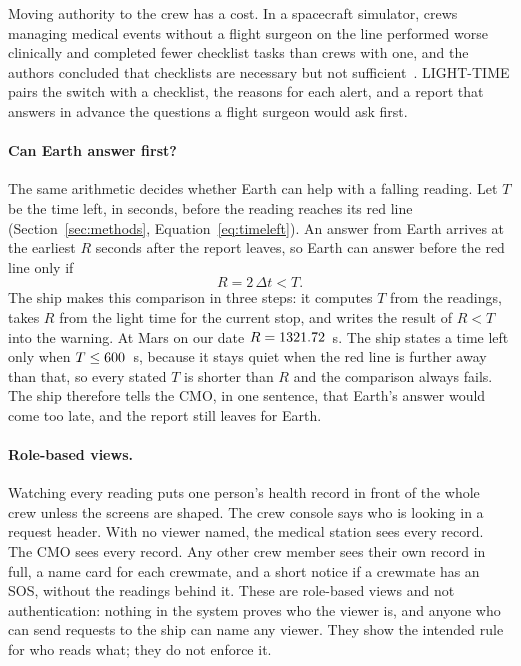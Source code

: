 Moving authority to the crew has a cost. In a spacecraft simulator, crews managing medical events without a flight surgeon on the line performed worse clinically and completed fewer checklist tasks than crews with one, and the authors concluded that checklists are necessary but not sufficient~\cite{yule2023crew}. LIGHT-TIME pairs the switch with a checklist, the reasons for each alert, and a report that answers in advance the questions a flight surgeon would ask first.



\paragraph{Can Earth answer first?}
The same arithmetic decides whether Earth can help with a falling reading. Let $T$ be the time left, in seconds, before the reading reaches its red line (Section~\ref{sec:methods}, Equation~\ref{eq:timeleft}). An answer from Earth arrives at the earliest $R$ seconds after the report leaves, so Earth can answer before the red line only if
\begin{equation}\label{eq:earthfirst}
  R = 2\,\Delta t < T .
\end{equation}
The ship makes this comparison in three steps: it computes $T$ from the readings, takes $R$ from the light time for the current stop, and writes the result of $R < T$ into the warning. At Mars on our date $R = 1321.72$~s. The ship states a time left only when $T \le 600$~s, because it stays quiet when the red line is further away than that, so every stated $T$ is shorter than $R$ and the comparison always fails. The ship therefore tells the CMO, in one sentence, that Earth's answer would come too late, and the report still leaves for Earth.

\paragraph{Role-based views.}
Watching every reading puts one person's health record in front of the whole crew unless the screens are shaped. The crew console says who is looking in a request header. With no viewer named, the medical station sees every record. The CMO sees every record. Any other crew member sees their own record in full, a name card for each crewmate, and a short notice if a crewmate has an SOS, without the readings behind it. These are role-based views and not authentication: nothing in the system proves who the viewer is, and anyone who can send requests to the ship can name any viewer. They show the intended rule for who reads what; they do not enforce it.

